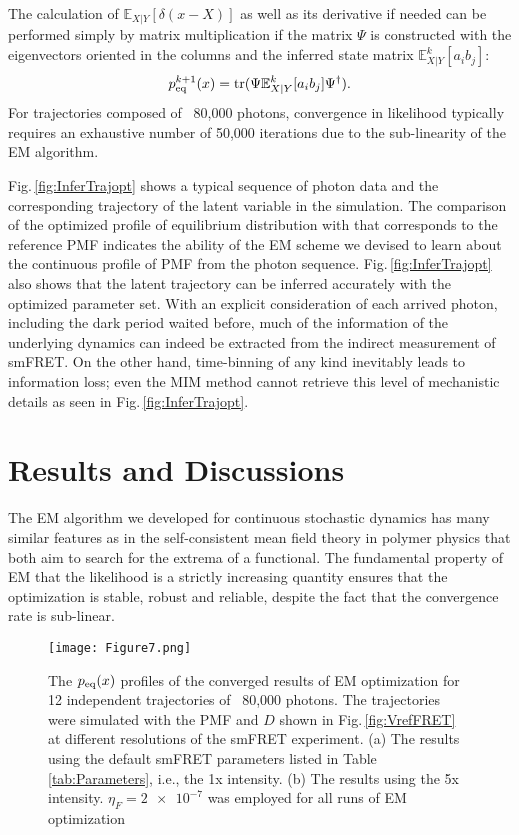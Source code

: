 \documentclass[journal=jpcbfk,manuscript=article,layout=twocolumn,articletitle=true]{achemso}
\DeclareMathOperator*{\tr}{tr}
\begin{document}
The calculation of $\mathbb{E}_{X|Y} [ \delta(x-X) ]$ as well as its derivative if needed can be performed simply by matrix multiplication if the matrix $\Psi$ is constructed with the eigenvectors oriented in the columns and the inferred state matrix $\mathbb{E}^k_{X|Y}[a_ib_j]$:
\begin{align}
p_{\rm eq}^{k+1}(x) = \tr ( \Psi \mathbb{E}^k_{X|Y}[a_ib_j] \Psi^ \dagger).
\end{align}
For trajectories composed of ~80,000 photons, convergence in likelihood typically requires an exhaustive number of 50,000 iterations due to the sub-linearity of the EM algorithm.\cite{Xu:1996ie}

Fig.\,\ref{fig:InferTrajopt} shows a typical sequence of photon data and the corresponding trajectory of the latent variable in the simulation. The comparison of the optimized profile of equilibrium distribution with that corresponds to the reference PMF indicates the ability of the EM scheme we devised to learn about the continuous profile of PMF from the photon sequence. Fig.\,\ref{fig:InferTrajopt} also shows that the latent trajectory can be inferred accurately with the optimized parameter set. With an explicit consideration of each arrived photon, including the dark period waited before, much of the information of the underlying dynamics can indeed be extracted from the indirect measurement of smFRET. On the other hand, time-binning of any kind inevitably leads to information loss; even the MIM method cannot retrieve this level of mechanistic details as seen in Fig.\,\ref{fig:InferTrajopt}. 

\section{Results and Discussions}

The EM algorithm we developed for continuous stochastic dynamics has many similar features as in the self-consistent mean field theory in polymer physics that both aim to search for the extrema of a functional.  The fundamental property of EM that the likelihood is a strictly increasing quantity ensures that the optimization is stable, robust and reliable, despite the fact that the convergence rate is sub-linear.\cite{Xu:1996ie}

\begin{figure}[hb!]
\centering
\label{fig:peqs}
\texttt{[image: Figure7.png]}
\caption[Converged equilibrium probability from smFRET]{\label{fig:Peqs}The $p_{\rm{eq}}(x)$ profiles of the converged results of EM optimization for 12 independent trajectories of ~80,000 photons. The trajectories were simulated with the PMF and $D$ shown in Fig.\,\ref{fig:VrefFRET} at different resolutions of the smFRET experiment. (a) The results using the default smFRET parameters listed in Table\,\ref{tab:Parameters}, i.e., the 1x intensity. (b) The results using the 5x intensity. $\eta_F=\num{2e-7}$ was employed for all runs of EM optimization}
\end{figure} 
\end{document}
